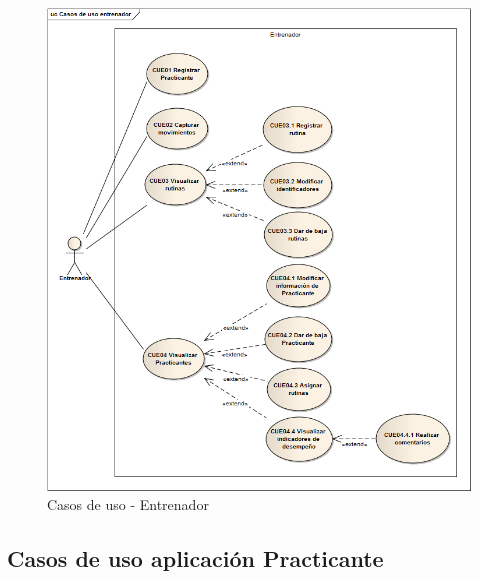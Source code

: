 \begin{figure}[H]
	\begin{center}
		\includegraphics[scale=0.6]{./Figuras/Casos/Casos_de_uso_entrenador}
	\end{center}
	\caption{Casos de uso - Entrenador}
	\label{fig:CU_Entrenador}
\end{figure}














\subsection{Casos de uso aplicación Practicante}


